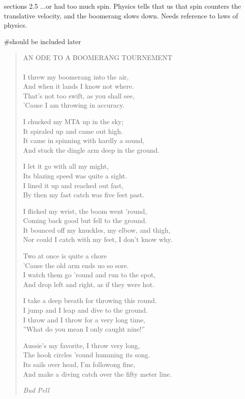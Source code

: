 sections 2.5
...or had too much spin.
Physics tells that us that spin counters the translative velocity, and the boomerang slows down.
Needs reference to laws of physics.

#should be included later 

\begin{quote}
AN ODE TO A BOOMERANG TOURNEMENT\\
\\
I threw my boomerang into the air,\\
  And when it lands I know not where.\\
That’s not too swift, as you shall see,\\
  ’Cause I am throwing in accuracy.

I chucked my MTA up in the sky;\\
  It spiraled up and came out high.\\
It came in spinning with hardly a sound,\\
   And stuck the dingle arm deep in the ground.
   
I let it go with all my might,\\
  Its blazing speed was quite a sight.\\
I lined it up and reached out fast,\\
  By then my fast catch was five feet past.
  
I flicked my wrist, the boom went ’round,\\
  Coming back good but fell to the ground.\\
It bounced off my knuckles, my elbow, and thigh,\\
  Nor could I catch with my feet, I don’t know why.

Two at once is quite a chore\\
  ’Cause the old arm ends uo so sore.\\
I watch them go ’round and run to the spot,\\
  And drop left and right, as if they were hot.

I take a deep breath for throwing this round.\\
  I jump and I leap and dive to the ground.\\
I throw and I throw for a very long time,\\
 ”What do you mean I only caught nine!”

Aussie’s my favorite, I throw very long,\\
  The hook circles ’round humming its song.\\
Its sails over head, I’m followong fine,\\
  And make a diving catch over the fifty meter line.

\footnotesize \textit{Bud Pell}
\end{quote}

